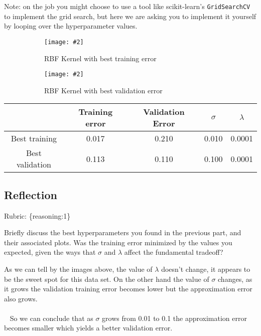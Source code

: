\documentclass{article}
\def\rubric#1{\gre{Rubric: \{#1\}}}{}
\def\gre#1{{\color{gre}#1}}
\def\ans#1{{\color{ans}#1}}
\newcommand{\centerfig}[2]{\begin{center}\texttt{[image: \#2]}\end{center}}
\begin{document}
Note: on the job you might choose to use a tool like scikit-learn's \texttt{GridSearchCV} to implement the grid search, but here we are asking you to implement it yourself by looping over the hyperparameter values.

\ans{
    \begin{figure}[htp]
        \begin{subfigure}[b]{0.5\textwidth} \color{ans}
            \centerfig{1.0}{../figs/logRegRBFKernel_MaxTrain.png}
            {
              \begin{center}
                 RBF Kernel with best training error
              \end{center}
            }
          \label{fig:1}
        \end{subfigure}
        \begin{subfigure}[b]{0.5\textwidth} \color{ans}
            \centerfig{1.0}{../figs/logRegRBFKernel_MaxValidation.png}
           {
               \begin{center}
                RBF Kernel with best validation error
               \end{center}
           }
          \label{fig:2}
        \end{subfigure}
    \end{figure}
    \scriptsize
    \setlength{\tabcolsep}{2pt}
    \begin{center}
    \begin{tabular}{SSSSS} \toprule
       {} & {Training error} & {Validation Error} & {$\sigma$} & {$\lambda$} \\ \midrule
       {Best training} & 0.017 & 0.210 & 0.010 & 0.0001 \\ \midrule
       {Best validation} & 0.113 & 0.110 & 0.100 & 0.0001 \\ \bottomrule
    \end{tabular}
    \end{center}
    \normalsize
}


\subsection{Reflection}
\rubric{reasoning:1}

Briefly discuss the best hyperparameters you found in the previous part, and their associated plots. Was the training error minimized by the values you expected, given the ways that $\sigma$ and $\lambda$ affect the fundamental tradeoff?

\ans{
    As we can tell by the images above, the value of $\lambda$ doesn't change, it appears to 
    be the sweet spot for this data set. On the other hand the value of $\sigma$ changes, as it grows
    the validation training error becomes lower but the approximation error also grows. \\ \\ 
    So we can conclude that as $\sigma$ grows from 0.01 to 0.1 the approximation error becomes smaller 
    which yields a better validation error.
}
\end{document}
